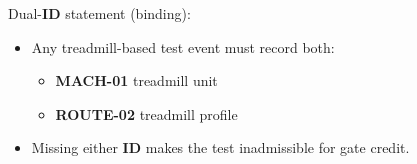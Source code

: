 \documentclass[10pt]{article}
\begin{document}
\begin{landscape}
\begin{enumerate}
Dual-\textbf{ID} statement (binding):

\begin{itemize}
\item Any treadmill-based test event must record both:
\begin{itemize}
\item \textbf{MACH-01} treadmill unit
\item \textbf{ROUTE-02} treadmill profile
\end{itemize}
\item Missing either \textbf{ID} makes the test inadmissible for gate credit.
\end{itemize}

\end{enumerate}

\end{landscape}
\end{document}
